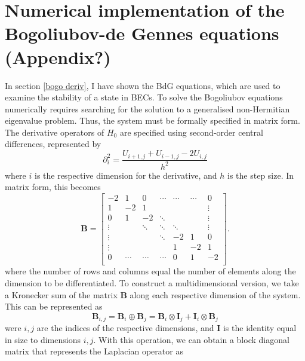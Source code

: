 \section{Numerical implementation of the Bogoliubov-de Gennes equations (Appendix?)}
In section \ref{bogo deriv}, I have shown the BdG equations, which are used to examine the stability of a state in BECs. To solve the Bogoliubov equations numerically requires searching for the solution to a generalised non-Hermitian eigenvalue problem. Thus, the system must be formally specified in matrix form. The derivative operators of $H_0$ are specified using second-order central differences, represented by
\begin{equation}
    \partial^2_i = \frac{U_{i+1,j} + U_{i-1,j} - 2U_{i,j}}{h^2}
\end{equation}
where $i$ is the respective dimension for the derivative, and $h$ is the step size. In matrix form, this becomes
\begin{equation}
    \mathbf{B} =
    \begin{bmatrix}
            -2      &   1    &    0   &  \cdots   &  \cdots   &  \cdots   & 0 \\
            1       &   -2   &    1   &           &           &     &  \vdots \\
            0       &    1   &   -2   & \ddots    &           &     &  \vdots \\
            \vdots  &        & \ddots & \ddots    & {\ddots}  &     &  \vdots \\
            \vdots  &        &        & \ddots    &    -2     &  1  &       0 \\
            \vdots  &        &        &           &     1     & -2  &       1 \\
            0       & \cdots & \cdots & \cdots    &     0     &  1  &      -2 \\
        \end{bmatrix}.
\end{equation}
where the number of rows and columns equal the number of elements along the dimension to be differentiated. To construct a multidimensional version, we take a Kronecker sum of the matrix $\mathbf{B}$ along each respective dimension of the system. This can be represented as
\begin{equation}
    \mathbf{B}_{i,j} = \mathbf{B}_i \oplus \mathbf{B}_j = \mathbf{B}_i \otimes \mathbf{I}_j + \mathbf{I}_i \otimes \mathbf{B}_j
\end{equation}
were $i,j$ are the indices of the respective dimensions, and $\mathbf{I}$ is the identity equal in size to dimensions $i,j$. With this operation, we can obtain a block diagonal matrix that represents the Laplacian operator as

